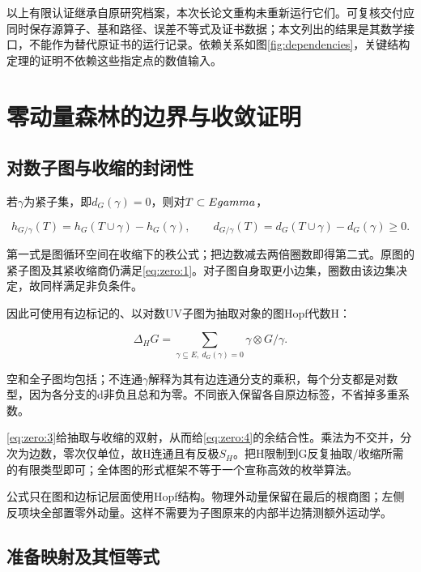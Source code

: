 \documentclass[11pt,a4paper,oneside]{ctexart}
\theoremstyle{cnplain}
\theoremstyle{definition}
\theoremstyle{remark}
\numberwithin{equation}{section}
\begin{document}
以上有限认证继承自原研究档案，本次长论文重构未重新运行它们。可复核交付应同时保存源算子、基和路径、误差不等式及证书数据；本文列出的结果是其数学接口，不能作为替代原证书的运行记录。依赖关系如图\ref{fig:dependencies}，关键结构定理的证明不依赖这些指定点的数值输入。

\section{零动量森林的边界与收敛证明}\label{app:zero-proof}

\begingroup

\subsection{对数子图与收缩的封闭性}\label{sec:zero:2}

若\(\gamma \)为紧子集，即\(d_G(\gamma )=0\)，则对\(T\subset E\\gamma \)，

\begin{equation}
h_{G/\gamma}(T)=h_G(T\cup\gamma)-h_G(\gamma),\qquad
 d_{G/\gamma}(T)=d_G(T\cup\gamma)-d_G(\gamma)\geq0.     \label{eq:zero:3}
\end{equation}

第一式是图循环空间在收缩下的秩公式；把边数减去两倍圈数即得第二式。原图的紧子图及其紧收缩商仍满足\eqref{eq:zero:1}。对子图自身取更小边集，圈数由该边集决定，故同样满足非负条件。

因此可使用有边标记的、以对数UV子图为抽取对象的图Hopf代数H：

\begin{equation}
\Delta_H G=\sum_{\gamma\subseteq E,\ d_G(\gamma)=0}
                         \gamma\otimes G/\gamma.             \label{eq:zero:4}
\end{equation}

空和全子图均包括；不连通\(\gamma \)解释为其有边连通分支的乘积，每个分支都是对数型，因为各分支的d非负且总和为零。不同嵌入保留各自原边标签，不省掉多重系数。

\eqref{eq:zero:3}给抽取与收缩的双射，从而给\eqref{eq:zero:4}的余结合性。乘法为不交并，分次为边数，零次仅单位，故H连通且有反极\(S_H\)。把H限制到G反复抽取/收缩所需的有限类型即可；全体图的形式框架不等于一个宣称高效的枚举算法。

公式只在图和边标记层面使用Hopf结构。物理外动量保留在最后的根商图；左侧反项块全部置零外动量。这样不需要为子图原来的内部半边猜测额外运动学。


\subsection{准备映射及其恒等式}\label{sec:zero:3}
\end{document}
